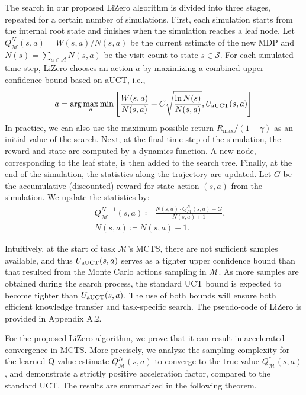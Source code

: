 The search in our proposed LiZero algorithm is divided into three stages, repeated for a certain number of simulations. First, each simulation starts from the internal root state and finishes when the simulation reaches a leaf node. Let $Q^N_{\mathcal{M}}(s,a)=W(s,a)/N(s,a)$ be the current estimate of the new MDP and $N(s)=\sum_{a\in \mathcal{A}} N(s,a)$ be the visit count to state $s\in\mathcal{S}$. For each simulated time-step, LiZero chooses an action $a$ by maximizing a combined upper confidence bound based on aUCT, i.e.,
\begin{equation}
a={\rm arg} \max_a \min \left[ \frac{W(s,a)}{N(s,a)} + C\sqrt{\frac{\ln N(s)}{N(s,a)}}, U_{\rm aUCT}(s,a)\right] \nonumber 
\end{equation}
In practice, we can also use the maximum possible return $R_{\max}/(1-\gamma)$ as an initial value of the search. Next, at the final time-step of the simulation, the reward and state are computed by a dynamics function. A new node, corresponding to the leaf state, is then added to the search tree. Finally, at the end of the simulation, the statistics along the trajectory are updated. Let $G$ be the accumulative (discounted) reward for state-action $(s,a)$ from the simulation. We update the statistics by:
\begin{eqnarray}
& & Q^{N+1}_{\mathcal{M}}(s,a) \coloneq \frac{N(s,a)\cdot Q^{N}_{\mathcal{M}}(s,a)+G}{N(s,a)+1}, \nonumber \\
& & N(s,a) \coloneq  N(s,a) +1. \nonumber
\end{eqnarray}


Intuitively, at the start of task $\mathcal{M}$'s MCTS, there are not sufficient samples available, and thus $U_{\rm aUCT}(s,a)$ serves as a tighter upper confidence bound than that resulted from the Monte Carlo actions sampling in $\mathcal{M}$. As more samples are obtained during the search process, the standard UCT bound is expected to become tighter than $U_{\rm aUCT}(s,a)$. The use of both bounds will ensure both efficient knowledge transfer and task-specific search. The pseudo-code of LiZero is provided in Appendix A.2.


For the proposed LiZero algorithm, we prove that it can result in accelerated convergence in MCTS. More precisely, we analyze the sampling complexity for the learned Q-value estimate $Q^N_{\mathcal{M}}(s,a)$ to converge to the true value $Q^{*}_{\mathcal{M}}(s,a)$, and demonstrate a strictly positive acceleration factor, compared to the standard UCT. The results are summarized in the following theorem.


